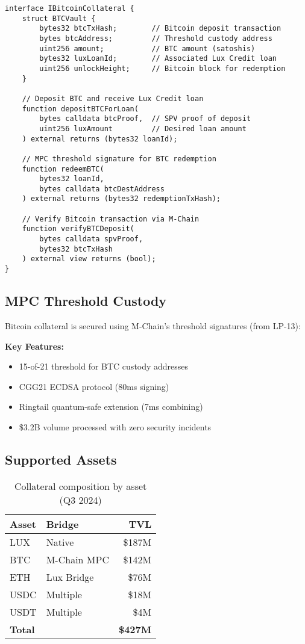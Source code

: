 \documentclass[11pt,a4paper]{article}
\begin{document}
\begin{lstlisting}[language=Solidity, basicstyle=\small\ttfamily]
interface IBitcoinCollateral {
    struct BTCVault {
        bytes32 btcTxHash;        // Bitcoin deposit transaction
        bytes btcAddress;         // Threshold custody address
        uint256 amount;           // BTC amount (satoshis)
        bytes32 luxLoanId;        // Associated Lux Credit loan
        uint256 unlockHeight;     // Bitcoin block for redemption
    }
    
    // Deposit BTC and receive Lux Credit loan
    function depositBTCForLoan(
        bytes calldata btcProof,  // SPV proof of deposit
        uint256 luxAmount         // Desired loan amount
    ) external returns (bytes32 loanId);
    
    // MPC threshold signature for BTC redemption
    function redeemBTC(
        bytes32 loanId,
        bytes calldata btcDestAddress
    ) external returns (bytes32 redemptionTxHash);
    
    // Verify Bitcoin transaction via M-Chain
    function verifyBTCDeposit(
        bytes calldata spvProof,
        bytes32 btcTxHash
    ) external view returns (bool);
}
\end{lstlisting}

\subsection{MPC Threshold Custody}

Bitcoin collateral is secured using M-Chain's threshold signatures (from LP-13):

\textbf{Key Features:}
\begin{itemize}
\item 15-of-21 threshold for BTC custody addresses
\item CGG21 ECDSA protocol (80ms signing)
\item Ringtail quantum-safe extension (7ms combining)
\item \$3.2B volume processed with zero security incidents
\end{itemize}

\subsection{Supported Assets}

\begin{table}[h]
\centering
\begin{tabular}{@{}llr@{}}
\toprule
\textbf{Asset} & \textbf{Bridge} & \textbf{TVL} \\ \midrule
LUX & Native & \$187M \\
BTC & M-Chain MPC & \$142M \\
ETH & Lux Bridge & \$76M \\
USDC & Multiple & \$18M \\
USDT & Multiple & \$4M \\ \midrule
\textbf{Total} & & \textbf{\$427M} \\ \bottomrule
\end{tabular}
\caption{Collateral composition by asset (Q3 2024)}
\end{table}
\end{document}
